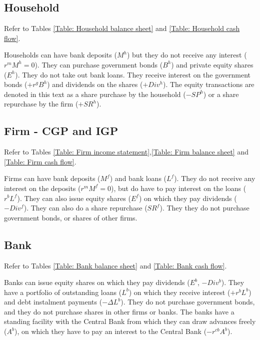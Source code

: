 \subsection{Household}
Refer to Tables \ref{Table: Household balance sheet} and \ref{Table: Household cash flow}.

Households can have bank deposits ($M^h$) but they do not receive any interest ($r^{m} M^h=0$).
They can purchase government bonds ($B^h$) and private equity shares ($E^h$). They do not take out bank loans. They receive interest on the government bonds ($+r^gB^h$) and dividends on the shares ($+Div^h$). The equity transactions are denoted in this text as a share purchase by the household ($-SP^h$) or a share repurchase by the firm ($+SR^h$).

\subsection{Firm - CGP and IGP}
Refer to Tables \ref{Table: Firm income statement},\ref{Table: Firm balance sheet} and \ref{Table: Firm cash flow}.

Firms can have bank deposits ($M^f$) and bank loans ($L^f$). They do not receive any interest on the deposits ($r^{m} M^f=0$), but do have to pay interest on the loans ($r^b L^f$). They can also issue equity shares ($E^f$) on which they pay dividends ($-Div^f$). They can also do a share repurchase ($SR^f$). They they do not purchase government bonds, or shares of other firms.

\subsection{Bank}
Refer to Tables \ref{Table: Bank balance sheet} and \ref{Table: Bank cash flow}.

Banks can issue equity shares on which they pay dividends ($E^b$, $-Div^b$). They have a portfolio of outstanding loans ($L^b$) on which they receive interest ($+r^b L^b$) and debt instalment payments ($-\Delta L^b$).
They do not purchase government bonds, and they do not purchase shares in other firms or banks. The banks have a standing facility with the Central Bank from which they can draw advances freely ($A^b$), on which they have to pay an interest to the Central Bank ($-r^{cb}A^b$).

